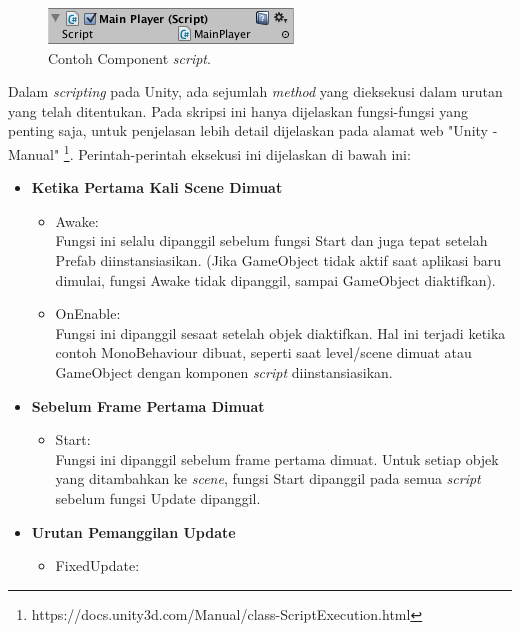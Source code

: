 \begin{figure}[htbp]
\centering
\includegraphics[scale=1]{Gambar/ScriptInInspector.png}
\caption{Contoh Component \textit{script}.} 
\label{fig:contoh-component-scripts}
\end{figure}

Dalam \textit{scripting} pada Unity, ada sejumlah \textit{method} yang dieksekusi dalam urutan yang telah ditentukan. Pada skripsi ini hanya dijelaskan fungsi-fungsi yang penting saja, untuk penjelasan lebih detail dijelaskan pada alamat web "Unity - Manual" \footnote{https://docs.unity3d.com/Manual/class-ScriptExecution.html}. Perintah-perintah eksekusi ini dijelaskan di bawah ini:
\begin{itemize}
    \item \textbf{Ketika Pertama Kali Scene Dimuat}\\
    \begin{itemize}
        \item Awake:\\
        Fungsi ini selalu dipanggil sebelum fungsi Start dan juga tepat setelah Prefab diinstansiasikan. (Jika GameObject tidak aktif saat aplikasi baru dimulai, fungsi Awake tidak dipanggil, sampai GameObject diaktifkan).
        \item OnEnable:\\
        Fungsi ini dipanggil sesaat setelah objek diaktifkan. Hal ini terjadi ketika contoh MonoBehaviour dibuat, seperti saat level/scene dimuat atau GameObject dengan komponen \textit{script} diinstansiasikan.
    \end{itemize}
    \item \textbf{Sebelum Frame Pertama Dimuat}
    \begin{itemize}
        \item Start:\\
        Fungsi ini  dipanggil sebelum frame pertama dimuat. Untuk setiap objek yang ditambahkan ke \textit{scene}, fungsi Start dipanggil pada semua \textit{script} sebelum fungsi Update dipanggil.
    \end{itemize}
    \item \textbf{Urutan Pemanggilan Update}\\
    \begin{itemize}
        \item FixedUpdate:\\

\end{itemize}
\end{itemize}
